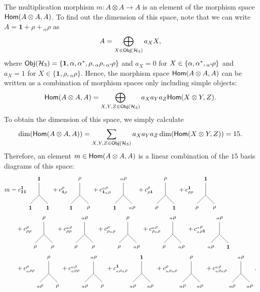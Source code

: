 {{{The multiplication morphism $m:A\otimes A\to A$ is an element of the morphism space $\mathsf{Hom}(A\otimes A,A)$. To find out the dimension of this space, note that we can write $A=\mathbf{1}+\rho+{}_\alpha\rho$ as
	\begin{equation}
		A=\bigoplus_{X\in\mathsf{Obj}({\mathcal{H}_3})}a_XX,
	\end{equation}
where $\mathsf{Obj}({\mathcal{H}_3})=\{\mathbf{1},\alpha,\alpha^*,\rho,{}_\alpha\rho,{}_{\alpha^*}\!\rho\}$ and $a_X=0$ for $X\in\{\alpha,\alpha^*,{}_{\alpha^*}\!\rho\}$ and $a_X=1$ for $X\in\{\mathbf{1},\rho,{}_\alpha\rho\}$. Hence, the morphism space $\mathsf{Hom}(A\otimes A,A)$ can be written as a combination of morphism spaces only including simple objects:
	\begin{equation}
		\mathsf{Hom}(A\otimes A,A)=\bigoplus_{X,Y,Z\in\mathsf{Obj}({\mathcal{H}_3})}a_Xa_Ya_Z\mathsf{Hom}(X\otimes Y,Z).
	\end{equation}
To obtain the dimension of this space, we simply calculate
	\begin{equation}
		\dim(\mathsf{Hom}(A\otimes A,A))=\sum_{X,Y,Z\in\mathsf{Obj}({\mathcal{H}_3})} a_Xa_Ya_Z\dim(\mathsf{Hom}(X\otimes Y,Z))=15.
	\end{equation}
Therefore, an element $m\in\mathsf{Hom}(A\otimes A,A)$ is a linear combination of the $15$ basis diagrams of this space:
	\begin{align}
		m &= c_{\mathbf{1}\mathbf{1}}^\mathbf{1}\vertex{\mathbf{1}}{\mathbf{1}}{\mathbf{1}} + c_{\mathbf{1}\rho}^{\rho}\vertex{\mathbf{1}}{\rho}{\rho} + c_{\mathbf{1}{}_\alpha\rho}^{{}_\alpha\rho}\vertex{\mathbf{1}}{{}_\alpha\rho}{{}_\alpha\rho} + c_{\rho\mathbf{1}}^{\rho}\vertex{\rho}{\mathbf{1}}{\rho}+	c_{\rho\rho}^{\mathbf{1}}\vertex{\rho}{\rho}{\mathbf{1}}\\ \label{eq:mdecomp} &\hspace{10pt} + c_{\rho\rho}^{\rho}\vertex{\rho}{\rho}{\rho} + c_{\rho\rho}^{{}_\alpha\rho}\vertex{\rho}{\rho}{{}_\alpha\rho} + c_{\rho{}_\alpha\rho}^{\rho}\vertex{\rho}{{}_\alpha\rho}{\rho}+c_{\rho{}_\alpha\rho}^{{}_\alpha\rho}\vertex{\rho}{{}_\alpha\rho}{{}_\alpha\rho}  + c_{{}_\alpha\rho \mathbf{1}}^{ {}_\alpha\rho}\vertex{{}_\alpha\rho}{\mathbf{1}}{{}_\alpha\rho}\\&\hspace{10pt}+ c_{{}_\alpha\rho\rho}^{\rho}\vertex{{}_\alpha\rho}{\rho}{\rho} + c_{{}_\alpha\rho\rho}^{ {}_\alpha\rho}\vertex{{}_\alpha\rho}{\rho}{{}_\alpha\rho}+  
		c_{{}_\alpha\rho  {}_\alpha\rho}^{ \mathbf{1}}\vertex{{}_\alpha\rho}{{}_\alpha\rho}{\mathbf{1}} + c_{{}_\alpha\rho  {}_\alpha\rho}^{\rho}\vertex{{}_\alpha\rho}{{}_\alpha\rho}{\rho} + c_{{}_\alpha\rho  {}_\alpha\rho}^{ {}_\alpha\rho}\vertex{{}_\alpha\rho}{{}_\alpha\rho}{{}_\alpha\rho}.

\end{align}}}}
